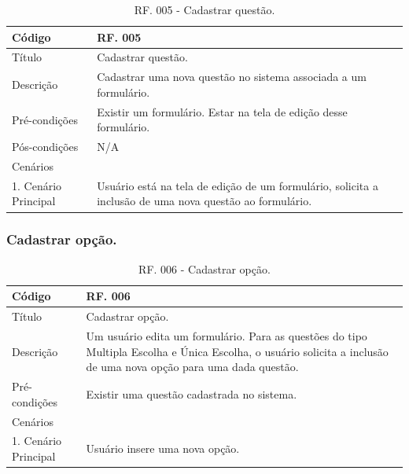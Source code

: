 \documentclass[11pt]{article}
\begin{document}
        \begin{table}[h]
          \begin{center}
            \begin{tabular}{ | p{5cm} | p{10cm} | }
              \hline
              Código\cellcolor{gray} & RF. 005\cellcolor{gray} \\
              \hline
              Título & Cadastrar questão. \\
              \hline
              Descrição & Cadastrar uma nova questão no sistema associada a um formulário. \\
              \hline
              Pré-condições & Existir um formulário. Estar na tela de edição desse formulário. \\
              \hline
              Pós-condições & N/A \\
              \hline
              Cenários &   \\
              \hline
              1.  Cenário Principal & Usuário está na tela de edição de um formulário, solicita a inclusão de uma nova questão ao formulário. \\
              \hline
            \end{tabular}
            \caption{RF. 005 - Cadastrar questão.}
          \end{center}
        \end{table}

      \subsubsection{Cadastrar opção.}

        \begin{table}[h]
          \begin{center}
            \begin{tabular}{ | p{5cm} | p{10cm} | }
              \hline
              Código\cellcolor{gray} & RF. 006\cellcolor{gray} \\
              \hline
              Título & Cadastrar opção. \\
              \hline
              Descrição & Um usuário edita um formulário. Para as questões do tipo Multipla Escolha e Única Escolha, o usuário solicita a inclusão de uma nova opção para uma dada questão. \\
              \hline
              Pré-condições & Existir uma questão cadastrada no sistema. \\
              \hline
              Cenários &   \\
              \hline
              1.  Cenário Principal & Usuário insere uma nova opção. \\
              \hline
            \end{tabular}
            \caption{RF. 006 - Cadastrar opção.}
          \end{center}
        \end{table}
\end{document}
